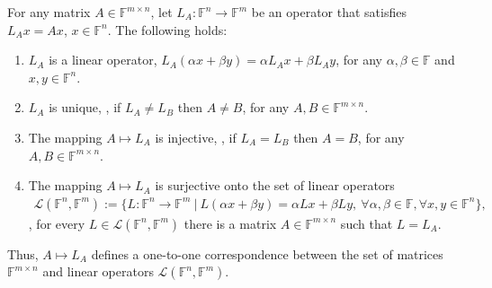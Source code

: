 \begin{theorem}
\label{conclusion:thm:matrix-linop}
For any matrix $A \in \mathbb{F}^{m \times n}$, let $L_A : \mathbb{F}^n
\rightarrow \mathbb{F}^m$ be an operator that satisfies $L_Ax = Ax$, $x \in
\mathbb{F}^n$. The following holds:
\begin{enumerate}
\item $L_A$ is a linear operator, \ie $L_A(\alpha x + \beta y) = \alpha L_A x +
\beta L_A y$, for any $\alpha,\beta \in \mathbb{F}$ and $x, y \in \mathbb{F}^n$.
\item $L_A$ is unique, \ie, if $L_A \neq L_B$ then $A \neq B$, for any $A, B
\in \mathbb{F}^{m \times n}$.
\item The mapping $A \mapsto L_A$ is injective, \ie, if $L_A = L_B$ then $A
= B$, for any $A, B \in \mathbb{F}^{m \times n}$.
\item The mapping $A \mapsto L_A$ is surjective onto the set of linear operators
\begin{align}
\mathcal{L}(\mathbb{F}^n,\mathbb{F}^m) := \lbrace L : \mathbb{F}^n \rightarrow
\mathbb{F}^m \ \vert \ L(\alpha x + \beta y) = \alpha Lx + \beta Ly, \ \forall
\alpha, \beta \in \mathbb{F}, \forall x, y \in \mathbb{F}^n \rbrace,
\end{align}
\ie, for every $L \in \mathcal{L}(\mathbb{F}^n,\mathbb{F}^m)$ there is a
matrix $A \in \mathbb{F}^{m \times n}$ such that $L = L_A$.
\end{enumerate}
Thus, $A \mapsto L_A$ defines a one-to-one correspondence between the set of
matrices $\mathbb{F}^{m \times n}$ and linear operators
$\mathcal{L}(\mathbb{F}^n, \mathbb{F}^m)$.
\end{theorem}
